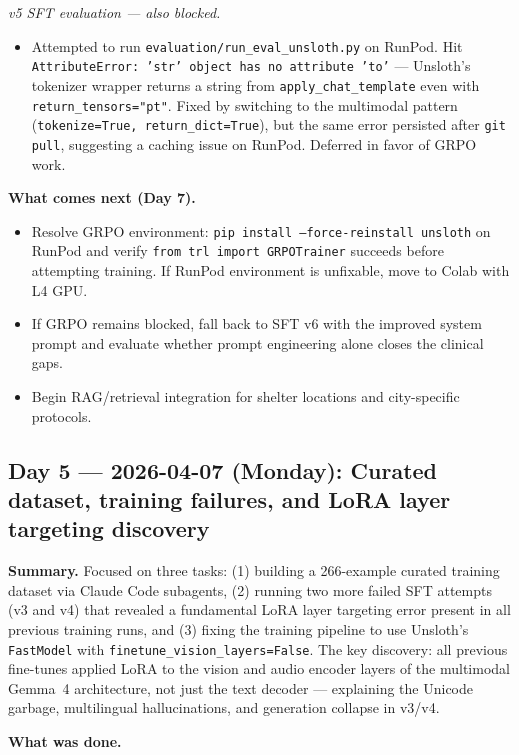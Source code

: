 \documentclass{article}
\theoremstyle{plain}
\theoremstyle{definition}
\theoremstyle{remark}
\begin{document}
\textit{v5 SFT evaluation --- also blocked.}
\begin{itemize}
\item Attempted to run \texttt{evaluation/run\_eval\_unsloth.py} on RunPod. Hit \texttt{AttributeError: 'str' object has no attribute 'to'} --- Unsloth's tokenizer wrapper returns a string from \texttt{apply\_chat\_template} even with \texttt{return\_tensors="pt"}. Fixed by switching to the multimodal pattern (\texttt{tokenize=True, return\_dict=True}), but the same error persisted after \texttt{git pull}, suggesting a caching issue on RunPod. Deferred in favor of GRPO work.
\end{itemize}

\textbf{What comes next (Day 7).}
\begin{itemize}
\item Resolve GRPO environment: \texttt{pip install --force-reinstall unsloth} on RunPod and verify \texttt{from trl import GRPOTrainer} succeeds before attempting training. If RunPod environment is unfixable, move to Colab with L4 GPU.
\item If GRPO remains blocked, fall back to SFT v6 with the improved system prompt and evaluate whether prompt engineering alone closes the clinical gaps.
\item Begin RAG/retrieval integration for shelter locations and city-specific protocols.
\end{itemize}

\subsection*{Day 5 --- 2026-04-07 (Monday): Curated dataset, training failures, and LoRA layer targeting discovery}

\textbf{Summary.} Focused on three tasks: (1) building a 266-example curated training dataset via Claude Code subagents, (2) running two more failed SFT attempts (v3 and v4) that revealed a fundamental LoRA layer targeting error present in all previous training runs, and (3) fixing the training pipeline to use Unsloth's \texttt{FastModel} with \texttt{finetune\_vision\_layers=False}. The key discovery: all previous fine-tunes applied LoRA to the vision and audio encoder layers of the multimodal Gemma~4 architecture, not just the text decoder --- explaining the Unicode garbage, multilingual hallucinations, and generation collapse in v3/v4.

\textbf{What was done.}
\end{document}
